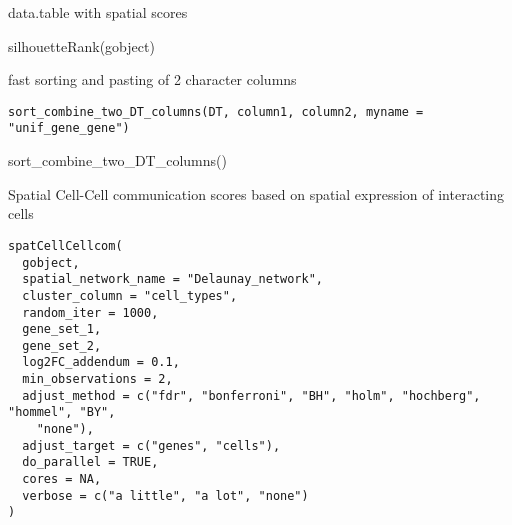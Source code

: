 \documentclass[a4paper]{book}
\begin{document}
%
\begin{Value}
data.table with spatial scores
\end{Value}
%
\begin{Examples}
\begin{ExampleCode}
    silhouetteRank(gobject)
\end{ExampleCode}
\end{Examples}
%
\begin{Description}\relax
fast sorting and pasting of 2 character columns
\end{Description}
%
\begin{Usage}
\begin{verbatim}
sort_combine_two_DT_columns(DT, column1, column2, myname = "unif_gene_gene")
\end{verbatim}
\end{Usage}
%
\begin{Examples}
\begin{ExampleCode}
    sort_combine_two_DT_columns()
\end{ExampleCode}
\end{Examples}
%
\begin{Description}\relax
Spatial Cell-Cell communication scores based on spatial expression of interacting cells
\end{Description}
%
\begin{Usage}
\begin{verbatim}
spatCellCellcom(
  gobject,
  spatial_network_name = "Delaunay_network",
  cluster_column = "cell_types",
  random_iter = 1000,
  gene_set_1,
  gene_set_2,
  log2FC_addendum = 0.1,
  min_observations = 2,
  adjust_method = c("fdr", "bonferroni", "BH", "holm", "hochberg", "hommel", "BY",
    "none"),
  adjust_target = c("genes", "cells"),
  do_parallel = TRUE,
  cores = NA,
  verbose = c("a little", "a lot", "none")
)
\end{verbatim}
\end{Usage}
%
\end{document}
